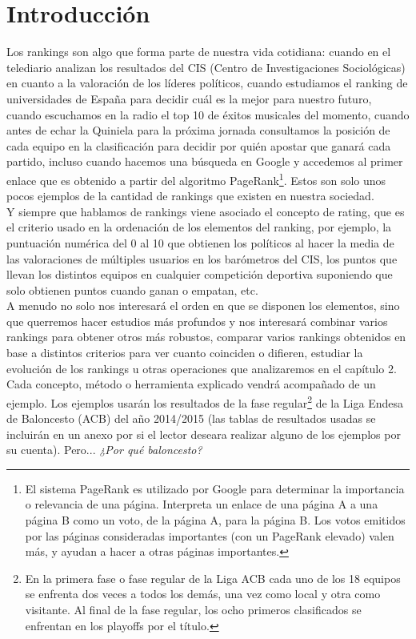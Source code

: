 \chapter{Introducción}
Los rankings son algo que forma parte de nuestra vida cotidiana: cuando en el telediario analizan los resultados del CIS (Centro de Investigaciones Sociológicas) en cuanto a la valoración de los líderes políticos, cuando estudiamos el ranking de universidades de España para decidir cuál es la mejor para nuestro futuro, cuando escuchamos en la radio el top 10 de éxitos musicales del momento, cuando antes de echar la Quiniela para la próxima jornada consultamos la posición de cada equipo en la clasificación para decidir por quién apostar que ganará cada partido, incluso cuando hacemos una búsqueda en Google y accedemos al primer enlace que es obtenido a partir del algoritmo PageRank\footnote{El sistema PageRank es utilizado por Google para determinar la importancia o relevancia de una página. Interpreta un enlace de una página A a una página B como un voto, de la página A, para la página B. Los votos emitidos por las páginas consideradas importantes (con un PageRank elevado) valen más, y ayudan a hacer a otras páginas importantes.}. Estos son solo unos pocos ejemplos de la cantidad de rankings que existen en nuestra sociedad.\\

Y siempre que hablamos de rankings viene asociado el concepto de rating, que es el criterio usado en la ordenación de los elementos del ranking, por ejemplo, la puntuación numérica del 0 al 10 que obtienen los políticos al hacer la media de las valoraciones de múltiples usuarios en los barómetros del CIS, los puntos que llevan los distintos equipos en cualquier competición deportiva suponiendo que solo obtienen puntos cuando ganan o empatan, etc.\\

A menudo no solo nos interesará el orden en que se disponen los elementos, sino que querremos hacer estudios más profundos y nos interesará combinar varios rankings para obtener otros más robustos, comparar varios rankings obtenidos en base a distintos criterios para ver cuanto coinciden o difieren, estudiar la evolución de los rankings u otras operaciones que analizaremos en el capítulo 2.\\

Cada concepto, método o herramienta explicado vendrá acompañado de un ejemplo. Los ejemplos usarán los resultados de la fase regular\footnote{En la primera fase o fase regular de la Liga ACB cada uno de los 18 equipos se enfrenta dos veces a todos los demás, una vez como local y otra como visitante. Al final de la fase regular, los ocho primeros clasificados se enfrentan en los playoffs por el título.} de la Liga Endesa de Baloncesto (ACB) del año 2014/2015 (las tablas de resultados usadas se incluirán en un anexo por si el lector deseara realizar alguno de los ejemplos por su cuenta). Pero... \textit{¿Por qué baloncesto?}

